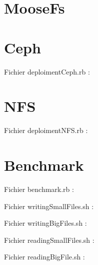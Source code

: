 \documentclass[12pt]{report}
\begin{document}
			\section{MooseFs}
			\section{Ceph}
			  Fichier deploimentCeph.rb :
				
			\section{NFS}
			  Fichier deploimentNFS.rb :
				
			\section{Benchmark}
				Fichier benchmark.rb :
				

				Fichier writingSmallFiles.sh :
				

				Fichier writingBigFiles.sh :
				

				Fichier readingSmallFiles.sh :
				

				Fichier readingBigFile.sh :
				
\end{document}
